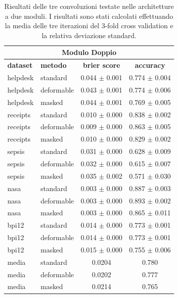 \documentclass[12pt,a4paper]{report}
\begin{document}
    \begin{table}[t]
    \caption{Risultati delle tre convoluzioni testate nelle architetture
        a due moduli. I risultati sono stati calcolati effettuando 
        la media delle tre iterazioni del 3-fold cross validation e la 
        relativa deviazione standard.}
    \begin{center} \label{table:results2}
    \begin{tabular}{llcc}
    \hline
    \multicolumn{4}{c}{\textbf{Modulo Doppio}} \\
    \hline
    \textbf{dataset} & \textbf{metodo} & \textbf{brier score} & \textbf{accuracy} \\
    \hline
    helpdesk & standard    & 0.044 $\pm$ 0.001 & 0.774 $\pm$ 0.004 \\
    helpdesk & deformable  & 0.043 $\pm$ 0.001 & 0.774 $\pm$ 0.006 \\
    helpdesk & masked      & 0.044 $\pm$ 0.001 & 0.769 $\pm$ 0.005 \\
    \hline
    receipts & standard    & 0.010 $\pm$ 0.000 & 0.838 $\pm$ 0.002 \\
    receipts & deformable  & 0.009 $\pm$ 0.000 & 0.863 $\pm$ 0.005 \\
    receipts & masked      & 0.010 $\pm$ 0.000 & 0.829 $\pm$ 0.002 \\
    \hline
    sepsis   & standard    & 0.031 $\pm$ 0.000 & 0.628 $\pm$ 0.009 \\
    sepsis   & deformable  & 0.032 $\pm$ 0.000 & 0.615 $\pm$ 0.007 \\
    sepsis   & masked      & 0.035 $\pm$ 0.002 & 0.571 $\pm$ 0.030 \\
    \hline
    nasa     & standard    & 0.003 $\pm$ 0.000 & 0.887 $\pm$ 0.003 \\
    nasa     & deformable  & 0.003 $\pm$ 0.000 & 0.893 $\pm$ 0.002 \\
    nasa     & masked      & 0.003 $\pm$ 0.000 & 0.865 $\pm$ 0.011 \\
    \hline
    bpi12    & standard    & 0.014 $\pm$ 0.000 & 0.773 $\pm$ 0.001 \\
    bpi12    & deformable  & 0.014 $\pm$ 0.000 & 0.773 $\pm$ 0.001 \\
    bpi12    & masked      & 0.015 $\pm$ 0.000 & 0.755 $\pm$ 0.006 \\
    \hline
    media    & standard    & 0.0204 & 0.780 \\
    media    & deformable  & 0.0202 & 0.777 \\
    media    & masked      & 0.0214 & 0.765 \\
    \hline
    \end{tabular}
    \end{center}
    \end{table}
\end{document}
